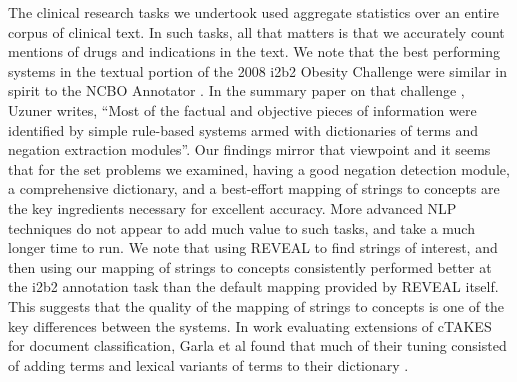 The clinical research tasks we undertook used aggregate statistics
over an entire corpus of clinical text.  In such tasks, all that
matters is that we accurately count mentions of drugs and indications
in the text.  We note that the best performing systems in the textual
portion of the 2008 i2b2 Obesity Challenge were similar in spirit to
the NCBO Annotator \cite{Uzuner2009}.  In the summary paper on that
challenge \cite{Uzuner2011}, Uzuner writes, “Most of the factual and
objective pieces of information were identified by simple rule-based
systems armed with dictionaries of terms and negation extraction
modules”.  Our findings mirror that viewpoint and it seems that for
the set problems we examined, having a good negation detection module,
a comprehensive dictionary, and a best-effort mapping of strings to
concepts are the key ingredients necessary for excellent accuracy.
More advanced NLP techniques do not appear to add much value to such
tasks, and take a much longer time to run.  We note that using REVEAL
to find strings of interest, and then using our mapping of strings to
concepts consistently performed better at the i2b2 annotation task
than the default mapping provided by REVEAL itself.  This suggests
that the quality of the mapping of strings to concepts is one of the
key differences between the systems.  In work evaluating extensions of
cTAKES for document classification, Garla et al found that much of
their tuning consisted of adding terms and lexical variants of terms
to their dictionary \cite{Garla2011}.

